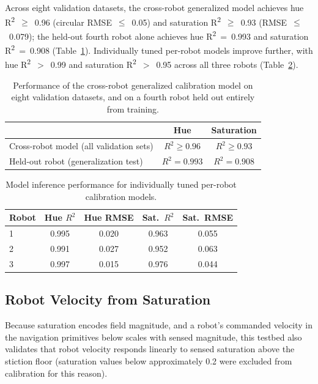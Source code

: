 \documentclass[12pt, letterpaper, oneside]{report}
\begin{document}
Across eight validation datasets, the cross-robot generalized model achieves
hue R\textsuperscript{2}~$\geq$~0.96 (circular RMSE~$\leq$~0.05) and
saturation R\textsuperscript{2}~$\geq$~0.93 (RMSE~$\leq$~0.079); the held-out
fourth robot alone achieves hue R\textsuperscript{2}~=~0.993 and saturation
R\textsuperscript{2}~=~0.908 (Table~\ref{tab:testbed_calibration}).
Individually tuned per-robot models improve further, with hue
R\textsuperscript{2}~$>$~0.99 and saturation R\textsuperscript{2}~$>$~0.95
across all three robots (Table~\ref{tab:testbed_individual}).

\begin{table}[h]
\centering
\caption{Performance of the cross-robot generalized calibration model on
eight validation datasets, and on a fourth robot held out entirely from
training.}
\label{tab:testbed_calibration}
\begin{tabular}{lcc}
\toprule
 & Hue & Saturation \\
\midrule
Cross-robot model (all validation sets) & $R^2 \geq 0.96$ & $R^2 \geq 0.93$ \\
Held-out robot (generalization test) & $R^2 = 0.993$ & $R^2 = 0.908$ \\
\bottomrule
\end{tabular}
\end{table}

\begin{table}[h]
\centering
\caption{Model inference performance for individually tuned per-robot
calibration models.}
\label{tab:testbed_individual}
\begin{tabular}{lcccc}
\toprule
Robot & Hue $R^2$ & Hue RMSE & Sat.\ $R^2$ & Sat.\ RMSE \\
\midrule
1 & 0.995 & 0.020 & 0.963 & 0.055 \\
2 & 0.991 & 0.027 & 0.952 & 0.063 \\
3 & 0.997 & 0.015 & 0.976 & 0.044 \\
\bottomrule
\end{tabular}
\end{table}

\subsection{Robot Velocity from Saturation}

Because saturation encodes field magnitude, and a robot's commanded velocity
in the navigation primitives below scales with sensed magnitude, this
testbed also validates that robot velocity responds linearly to sensed
saturation above the stiction floor (saturation values below approximately
0.2 were excluded from calibration for this reason).
\end{document}
